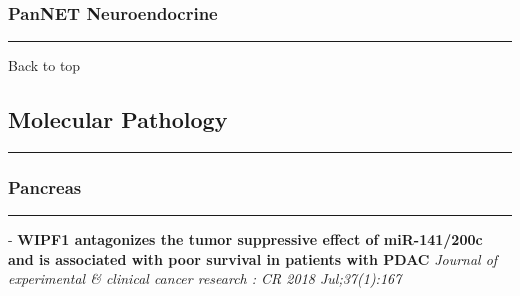 \documentclass[]{article}
\begin{document}
\hypertarget{pannet-neuroendocrine-1}{%
\subsubsection{PanNET Neuroendocrine}\label{pannet-neuroendocrine-1}}

\begin{center}\rule{0.5\linewidth}{\linethickness}\end{center}

Back to top

\pagebreak

\hypertarget{molecular-pathology}{%
\subsection{Molecular Pathology}\label{molecular-pathology}}

\begin{center}\rule{0.5\linewidth}{\linethickness}\end{center}

\hypertarget{pancreas-2}{%
\subsubsection{Pancreas}\label{pancreas-2}}

\begin{center}\rule{0.5\linewidth}{\linethickness}\end{center}

 - \textbf{WIPF1 antagonizes the tumor suppressive effect of
miR-141/200c and is associated with poor survival in patients with PDAC}
\emph{Journal of experimental \& clinical cancer research : CR 2018
Jul;37(1):167}
\end{document}
